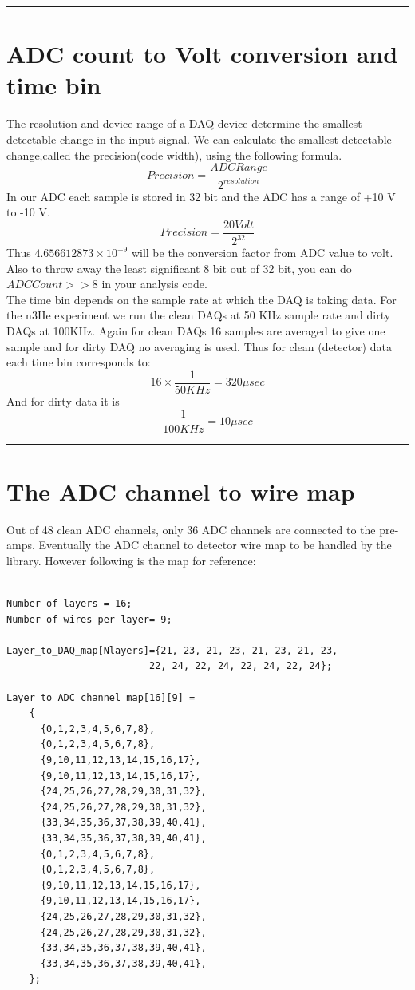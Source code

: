 \documentclass[12pt]{article}
\begin{document}
\noindent
{\color{red} \rule{\linewidth}{1mm} }
 
\newpage
\section{ADC count to Volt conversion and time bin}
The resolution and device range of a DAQ device determine the smallest
detectable change in the input signal. We can calculate the smallest
detectable change,called the precision(code width), using the following formula.
$$Precision =\frac{ADC Range}{2^{resolution}}$$
In our ADC each sample is stored in 32 bit and the ADC has a range of +10 V to -10 V.
$$Precision =\frac{20 Volt}{2^{32}}$$
Thus $4.656612873\times10^{-9}$ will be the conversion factor from ADC value to volt. Also to throw away the least significant 8 bit out of 32 bit, you can do $ADC Count>>8$ in your analysis code. \\

The time bin depends on the sample rate at which the DAQ is taking data. For the n3He experiment we run the clean DAQs at 50 KHz sample rate and dirty DAQs at 100KHz. Again for clean DAQs 16 samples are averaged to give one sample and for dirty DAQ no averaging is used. Thus for clean (detector) data each time bin corresponds to: 
$$16\times\frac{1}{50KHz}=320\mu sec$$
And for dirty data it is 
$$\frac{1}{100KHz} = 10 \mu sec$$

\noindent
{\color{red} \rule{\linewidth}{1mm} }
 
\newpage
\section{The ADC channel to wire map}
Out of 48 clean ADC channels, only 36 ADC channels are connected to the pre-amps.
Eventually the ADC channel to detector wire map to be handled by the library. However following is the map for reference:
\begin{lstlisting}

Number of layers = 16;
Number of wires per layer= 9;

Layer_to_DAQ_map[Nlayers]={21, 23, 21, 23, 21, 23, 21, 23,
                         22, 24, 22, 24, 22, 24, 22, 24};

Layer_to_ADC_channel_map[16][9] =
    {
      {0,1,2,3,4,5,6,7,8},
      {0,1,2,3,4,5,6,7,8},
      {9,10,11,12,13,14,15,16,17},
      {9,10,11,12,13,14,15,16,17},
      {24,25,26,27,28,29,30,31,32},
      {24,25,26,27,28,29,30,31,32},
      {33,34,35,36,37,38,39,40,41},
      {33,34,35,36,37,38,39,40,41},
      {0,1,2,3,4,5,6,7,8},
      {0,1,2,3,4,5,6,7,8},
      {9,10,11,12,13,14,15,16,17},
      {9,10,11,12,13,14,15,16,17},
      {24,25,26,27,28,29,30,31,32},
      {24,25,26,27,28,29,30,31,32},
      {33,34,35,36,37,38,39,40,41},
      {33,34,35,36,37,38,39,40,41},
    };
\end{lstlisting}
\end{document}
